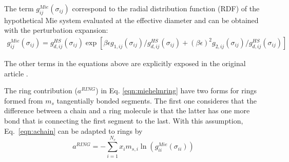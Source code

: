 	
	The term $g_{ij}^{Mie}(\sigma_{ij})$ correspond to the radial distribution function (RDF) of the hypothetical Mie system evaluated at the effective diameter and can be obtained with the perturbation expansion:
	\begin{equation}
	\begin{aligned}
	g_{ij}^{Mie}(\sigma_{ij}) =g_{d,ij}^{HS}(\sigma_{ij})\exp[\beta\epsilon g_{1,ij}(\sigma_{ij})/g_{d,ij}^{HS}(\sigma_{ij}) + (\beta\epsilon)^{2} g_{2,ij}(\sigma_{ij})/g_{d,ij}^{HS}(\sigma_{ij})]
	\end{aligned}
	\label{eqn:gmie}
	\end{equation}
	
	
	The other terms in the equations above are explicitly exposed in the original article \cite{lafitte2013}. 
	
	The ring contribution ($a^{RING}$) in Eq. \ref{eqn:miehelmring} have two forms for rings formed from $m_{s}$ tangentially bonded segments. The first one  \cite{lafitte2012} consideres that the difference between a chain and a ring molecule is that the latter has one more bond that is connecting the first segment to the last. With this assumption, Eq.~\eqref{eqn:achain} can be adapted to rings by
	\begin{equation}
	a^{RING} =-\sum_{i=1}^{N_{c}} x_{i}m_{s,i}\ln(g_{ii}^{Mie}(\sigma_{ii}))
	\label{eqn:aringlafitte}
	\end{equation}
	
